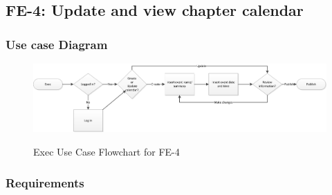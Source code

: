 \documentclass{article}
\begin{document}
\subsection{FE-4: Update and view chapter calendar}

\subsubsection{Use case Diagram}

\newpage

\FloatBarrier
\begin{figure}
\centering
\caption{Exec Use Case Flowchart for FE-4}
\includegraphics[scale=.75]{img/execUseCaseFE4.png}
\label{fig:execUseCaseFE4}
\end{figure}
\FloatBarrier

\newpage

\subsubsection{Requirements}
\end{document}

